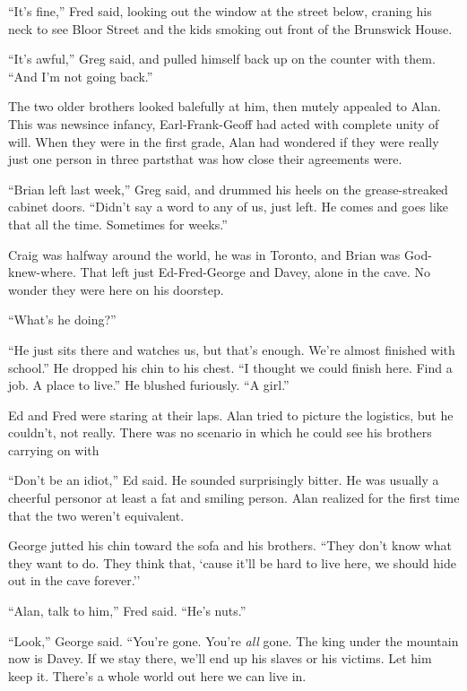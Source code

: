 ``It's fine,'' Fred said, looking out the window at the street below,
craning his neck to see Bloor Street and the kids smoking out front of
the Brunswick House.

``It's awful,'' Greg said, and pulled himself back up on the counter
with them.  ``And I'm not going back.''

The two older brothers looked balefully at him, then mutely appealed
to Alan.  This was new\dash{}since infancy, Earl-Frank-Geoff had acted
with complete unity of will.  When they were in the first grade, Alan
had wondered if they were really just one person in three parts\dash{}that
was how close their agreements were.

``Brian left last week,'' Greg said, and drummed his heels on the
grease-streaked cabinet doors.  ``Didn't say a word to any of us, just
left.  He comes and goes like that all the time.  Sometimes for
weeks.''

Craig was halfway around the world, he was in Toronto, and Brian was
God-knew-where.  That left just Ed-Fred-George and Davey, alone in the
cave.  No wonder they were here on his doorstep.

``What's he doing?''

``He just sits there and watches us, but that's enough.  We're almost
finished with school.'' He dropped his chin to his chest.  ``I thought
we could finish here.  Find a job.  A place to live.'' He blushed
furiously.  ``A girl.''

Ed and Fred were staring at their laps.  Alan tried to picture the
logistics, but he couldn't, not really.  There was no scenario in
which he could see his brothers carrying on with\dash{}

``Don't be an idiot,'' Ed said.  He sounded surprisingly bitter.  He
was usually a cheerful person\dash{}or at least a fat and smiling person. 
Alan realized for the first time that the two weren't equivalent.

George jutted his chin toward the sofa and his brothers.  ``They don't
know what they want to do.  They think that, `cause it'll be hard to
live here, we should hide out in the cave forever.''

``Alan, talk to him,'' Fred said.  ``He's nuts.''

``Look,'' George said.  ``You're gone.  You're \textit{all} gone.  The
king under the mountain now is Davey.  If we stay there, we'll end up
his slaves or his victims.  Let him keep it.  There's a whole world
out here we can live in.

